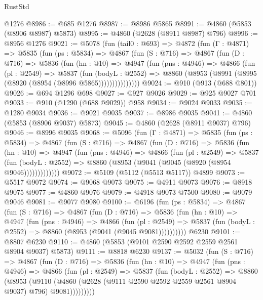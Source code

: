 \begin{lexlean}{RustStd}
\begin{coremodule}
    @1276
@8986 := @685 @1276
@8987 := @8986 @5865
@8991 := @4860 (@5853 (@8906 @8987) @5873)
@8995 := @4860 (@2628 (@8911 @8987) @796)
@8996 := @8956 @1276
@9021 := @5078
    (fun (tail0 : @693) =>
    @4872
      (fun (Γ : @4871) =>
      @5835
        (fun (ps : @5834) =>
        @4867
          (fun (S : @716) =>
          @4867
            (fun (D : @716) =>
            @5836
              (fun (hn : @10) =>
              @4947
                (fun (pns : @4946) =>
                @4866
                  (fun (pl : @2549) =>
                  @5837
                    (fun (bodyL : @2552) =>
                    @8860 (@8953 (@8991 (@8995 (@8920 (@8954 (@8996 @5865)))))))))))))))
@9024 := @910 (@913 (@688 @801))
@9026 := @694 @1296 @698
@9027 := @927 @9026
@9029 := @925 @9027 @701
@9033 := @910 (@1290 (@688 @9029)) @958
@9034 := @9024 @9033
@9035 := @1280 @9034
@9036 := @9021 @9035
@9037 := @8986 @9035
@9041 := @4860 (@5853 (@8906 @9037) @5873)
@9045 := @4860 (@2628 (@8911 @9037) @796)
@9046 := @8996 @9035
@9068 := @5096
    (fun (Γ : @4871) =>
    @5835
      (fun (ps : @5834) =>
      @4867
        (fun (S : @716) =>
        @4867
          (fun (D : @716) =>
          @5836
            (fun (hn : @10) =>
            @4947
              (fun (pns : @4946) =>
              @4866
                (fun (pl : @2549) =>
                @5837
                  (fun (bodyL : @2552) =>
                  @8860 (@8953 (@9041 (@9045 (@8920 (@8954 @9046)))))))))))))
@9072 := @5109 (@5112 (@5513 @5117)) @4899
@9073 := @5517 @9072
@9074 := @9068 @9073
@9075 := @4911 @9073
@9076 := @8918 @9075
@9077 := @4860 @9076
@9079 := @4918 @9073 @7500
@9080 := @9079 @9046
@9081 := @9077 @9080
@9100 := @6196
    (fun (ps : @5834) =>
    @4867
      (fun (S : @716) =>
      @4867
        (fun (D : @716) =>
        @5836
          (fun (hn : @10) =>
          @4947
            (fun (pns : @4946) =>
            @4866
              (fun (pl : @2549) =>
              @5837 (fun (bodyL : @2552) => @8860 (@8953 (@9041 (@9045 @9081))))))))))
    @6230
@9101 := @8807 @6230
@9110 := @4860 (@5853 (@9101 @2590 @2592 @2559 @2561 @8904 @9037) @5873)
@9111 := @8818 @6230
@9137 := @5032
    (fun (S : @716) =>
    @4867
      (fun (D : @716) =>
      @5836
        (fun (hn : @10) =>
        @4947
          (fun (pns : @4946) =>
          @4866
            (fun (pl : @2549) =>
            @5837
              (fun (bodyL : @2552) =>
              @8860
                (@8953
                  (@9110
                    (@4860 (@2628 (@9111 @2590 @2592 @2559 @2561 @8904 @9037) @796) @9081)))))))))

\end{coremodule}
\end{lexlean}
